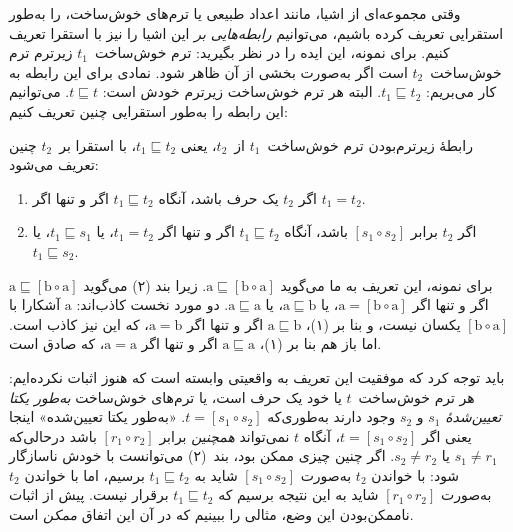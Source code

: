 \documentclass[../../../include/open-logic-section]{subfiles}
\begin{document}


وقتی مجموعه‌ای از اشیا، مانند اعداد طبیعی یا ترم‌های خوش‌ساخت، را
به‌طور استقرایی تعریف کرده باشیم، می‌توانیم \emph{رابطه‌هایی بر} این
اشیا را نیز با استقرا تعریف کنیم. برای نمونه، این ایده را در نظر
بگیرید: ترم خوش‌ساخت~$t_1$ زیرترم ترم خوش‌ساخت~$t_2$ است اگر به‌صورت
بخشی از آن ظاهر شود. نمادی برای این رابطه به کار می‌بریم:
$t_1 \sqsubseteq t_2$. البته هر ترم خوش‌ساخت زیرترم خودش است:
$t \sqsubseteq t$. می‌توانیم این رابطه را به‌طور استقرایی چنین تعریف
کنیم:

\begin{defn}
  رابطهٔ زیرترم‌بودن ترم خوش‌ساخت~$t_1$ از~$t_2$، یعنی
  $t_1 \sqsubseteq t_2$، با استقرا بر~$t_2$ چنین تعریف می‌شود:
  \begin{enumerate}
  \item اگر $t_2$ یک حرف باشد، آنگاه $t_1 \sqsubseteq t_2$ اگر و تنها
    اگر $t_1 = t_2$.
  \item اگر $t_2$ برابر $[s_1 \circ s_2]$ باشد، آنگاه
    $t_1 \sqsubseteq t_2$ اگر و تنها اگر $t_1 = t_2$، یا
    $t_1 \sqsubseteq s_1$، یا $t_1 \sqsubseteq s_2$.
  \end{enumerate}
\end{defn}

برای نمونه، این تعریف به ما می‌گوید
$\mathrm{a} \sqsubseteq [\mathrm{b} \circ \mathrm{a}]$. زیرا بند (۲)
می‌گوید $\mathrm{a} \sqsubseteq [\mathrm{b} \circ \mathrm{a}]$ اگر و
تنها اگر $\mathrm{a} = [\mathrm{b} \circ \mathrm{a}]$، یا
$\mathrm{a} \sqsubseteq \mathrm b$، یا
$\mathrm{a} \sqsubseteq \mathrm{a}$. دو مورد نخست کاذب‌اند:
$\mathrm{a}$ آشکارا با $[\mathrm{b} \circ \mathrm{a}]$ یکسان نیست، و
بنا بر (۱)، $\mathrm{a} \sqsubseteq \mathrm{b}$ اگر و تنها اگر
$\mathrm{a} = \mathrm{b}$، که این نیز کاذب است. اما باز هم بنا بر (۱)،
$\mathrm{a} \sqsubseteq \mathrm{a}$ اگر و تنها اگر
$\mathrm{a} = \mathrm{a}$، که صادق است.

باید توجه کرد که موفقیت این تعریف به واقعیتی وابسته است که هنوز اثبات
نکرده‌ایم: هر ترم خوش‌ساخت~$t$ یا خود یک حرف است، یا ترم‌های خوش‌ساخت
\emph{به‌طور یکتا تعیین‌شدهٔ} $s_1$ و $s_2$ وجود دارند به‌طوری‌که
$t = [s_1 \circ s_2]$. «به‌طور یکتا تعیین‌شده» اینجا یعنی اگر
$t = [s_1 \circ s_2]$، آنگاه $t$ نمی‌تواند \emph{همچنین} برابر
$[r_1 \circ r_2]$ باشد درحالی‌که $s_1 \neq r_1$ یا $s_2 \neq r_2$.
اگر چنین چیزی ممکن بود، بند~(۲) می‌توانست با خودش ناسازگار شود: با
خواندن $t_2$ به‌صورت $[s_1 \circ s_2]$ شاید به
$t_1 \sqsubseteq t_2$ برسیم، اما با خواندن $t_2$ به‌صورت
$[r_1 \circ r_2]$ شاید به این نتیجه برسیم که $t_1 \sqsubseteq t_2$
برقرار نیست. پیش از
اثبات ناممکن‌بودن این وضع، مثالی را ببینیم که در آن این اتفاق
\emph{ممکن} است.
\end{document}
